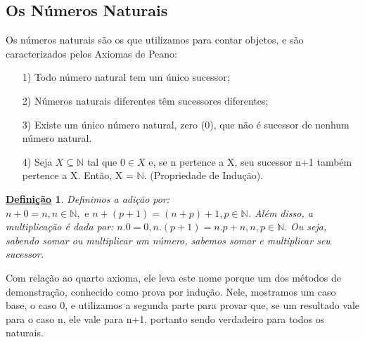 \documentclass{article}
\newtheorem*{def*}{\underline{Defini\c c\~ao}}
\begin{document}
\subsection{Os N\'umeros Naturais}
  Os n\'umeros naturais s\~ao os que utilizamos para contar objetos, e s\~ao caracterizados pelos Axiomas de Peano:
 \begin{itemize}
   \item[1)] Todo n\'umero natural tem um \'unico sucessor; 
   \item[2)] N\'umeros naturais diferentes t\^em sucessores diferentes;
   \item[3)] Existe um \'unico n\'umero natural, zero (0), que n\~ao \'e sucessor de nenhum n\'umero natural.
   \item[4)] Seja $X \subseteq{\mathbb{N}}$ tal que $0\in{X}$ e, se n pertence a X, seu sucessor n+1 tamb\'em pertence 
a X. Ent\~ao, X = $\mathbb{N}.$ (Propriedade de Indu\c c\~ao).
 \end{itemize}

\begin{def*}
  Definimos a adi\c c\~ao por: $n + 0 = n, n\in \mathbb{N},\text{ e }n+(p+1) = (n+p)+1, p\in{\mathbb{N}}$. Al\'em disso,
a multiplica\c c\~ao \'e dada por: $n.0 = 0, n.(p+1) = n.p + n, n, p\in\mathbb{N}.$ Ou seja, sabendo somar ou multiplicar um n\'umero,
sabemos somar e multiplicar seu sucessor.
\end{def*}
  Com rela\c c\~ao ao quarto axioma, ele leva este nome porque um dos m\'etodos de demonstra\c c\~ao, conhecido como
prova por indu\c c\~ao. Nele, mostramos um caso base, o caso 0, e utilizamos a segunda parte para provar que, se um
resultado vale para o caso n, ele vale para n+1, portanto sendo verdadeiro para todos os naturais.
\end{document}
